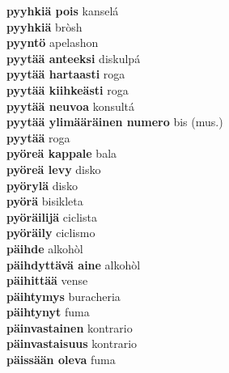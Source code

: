 \textbf{ pyyhkiä pois  } kanselá \\
\textbf{ pyyhkiä  } bròsh \\
\textbf{ pyyntö  } apelashon \\
\textbf{ pyytää anteeksi  } diskulpá \\
\textbf{ pyytää hartaasti  } roga \\
\textbf{ pyytää kiihkeästi  } roga \\
\textbf{ pyytää neuvoa  } konsultá \\
\textbf{ pyytää ylimääräinen numero  } bis (mus.) \\
\textbf{ pyytää  } roga \\
\textbf{ pyöreä kappale  } bala \\
\textbf{ pyöreä levy  } disko \\
\textbf{ pyörylä  } disko \\
\textbf{ pyörä  } bisikleta \\
\textbf{ pyöräilijä  } ciclista \\
\textbf{ pyöräily  } ciclismo \\
\textbf{ päihde  } alkohòl \\
\textbf{ päihdyttävä aine  } alkohòl \\
\textbf{ päihittää  } vense \\
\textbf{ päihtymys  } buracheria \\
\textbf{ päihtynyt  } fuma \\
\textbf{ päinvastainen  } kontrario \\
\textbf{ päinvastaisuus  } kontrario \\
\textbf{ päissään oleva  } fuma \\
